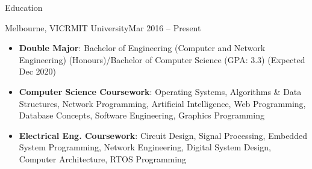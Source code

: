 \documentclass[]{mcdowellcv}
\begin{document}
	\makeheader
	
\iffalse
	\begin{cvsection}{Career Objective}
		\begin{cvsubsection}{}{}{}
			I am an enthusiastic final year computer science \& computer engineering double major seeking a software engineering graduate role at Google.
			I have excellent leadership and teamwork skills, from my 5 years of experience in hospitality and numerous university group projects over 4 years.
			I am experienced in programming, especially in C/C++, and fluent in common algorithms and data structures, from several university and hobby projects.
		\end{cvsubsection}
	\end{cvsection}
\fi
	\begin{cvsection}{Education}
		\begin{cvsubsection}{Melbourne, VIC}{RMIT University}{Mar 2016 -- Present}
			\begin{itemize}
				\item \textbf{Double Major}: Bachelor of Engineering (Computer and Network Engineering) (Honours)/Bachelor of Computer Science (GPA: 3.3) (Expected Dec 2020) 
				\item \textbf{Computer Science Coursework}: Operating Systems, Algorithms \& Data Structures, Network Programming, Artificial Intelligence, Web Programming, Database Concepts, Software Engineering, Graphics Programming
				\item \textbf{Electrical Eng. Coursework}: Circuit Design, Signal Processing, Embedded System Programming, Network Engineering, Digital System Design, Computer Architecture, RTOS Programming
			\end{itemize}
		\end{cvsubsection}
	\end{cvsection}
\end{document}
